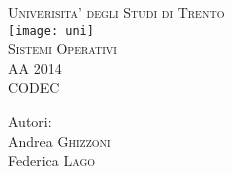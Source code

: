 \begin{titlepage}
\begin{center}

\vspace*{1cm}
        
\textsc{\LARGE Univerisita' degli Studi di Trento}\\[1.5cm] %
\texttt{[image: uni]}\\[1.5cm]
\textsc{\Large Sistemi Operativi}\\[0.5cm] %
\textsc{\large AA 2014}\\[0.5cm] %

\vspace{1.5cm}
\textsc{\LARGE CODEC}
\vspace{1.5cm}
        
\Large {Autori:}\\
Andrea \textsc{Ghizzoni}\\
Federica \textsc{Lago}\\
        
\end{center}
\end{titlepage}
